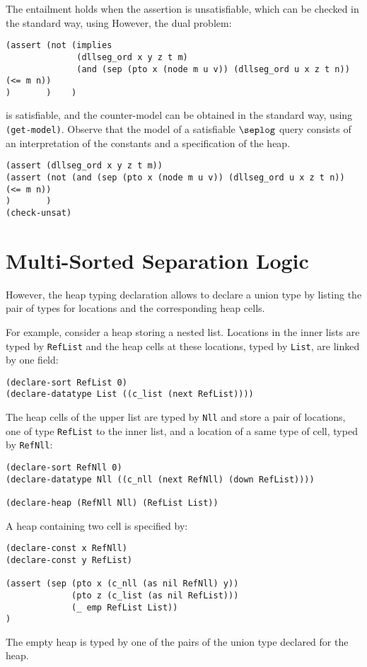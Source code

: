 \documentclass[10pt]{llncs}
\begin{document}
The entailment holds when the assertion is unsatisfiable, which can be
checked in the standard way, using 
However, the dual problem:
\begin{Verbatim}
(assert (not (implies 
              (dllseg_ord x y z t m)
              (and (sep (pto x (node m u v)) (dllseg_ord u x z t n)) (<= m n)) 
)       )    )
\end{Verbatim}
is satisfiable, and the counter-model can be obtained in the standard
way, using {\tt (get-model)}. Observe that the model of a satisfiable
$\seplog$ query consists of an interpretation of the constants and a
specification of the heap. 

\begin{Verbatim}
(assert (dllseg_ord x y z t m))
(assert (not (and (sep (pto x (node m u v)) (dllseg_ord u x z t n)) (<= m n))
)       )
(check-unsat)
\end{Verbatim}



\section{Multi-Sorted Separation Logic}
\label{sec:tsl}

However, the heap typing declaration allows to declare a union type
by listing the pair of types for locations and the corresponding 
heap cells.

For example, consider a heap storing a nested list.
Locations in the inner lists are typed by {\tt RefList} and 
the heap cells at these locations, typed by {\tt List}, 
are linked by one field:
\begin{Verbatim}
(declare-sort RefList 0)
(declare-datatype List ((c_list (next RefList))))
\end{Verbatim}
The heap cells of the upper list are typed by {\tt Nll} and 
store a pair of locations, one of type {\tt RefList} to the inner list,
and a location of a same type of cell, typed by {\tt RefNll}:
\begin{Verbatim}
(declare-sort RefNll 0)
(declare-datatype Nll ((c_nll (next RefNll) (down RefList))))

(declare-heap (RefNll Nll) (RefList List))
\end{Verbatim}
A heap containing two cell is specified by:
\begin{Verbatim}
(declare-const x RefNll)
(declare-const y RefList)

(assert (sep (pto x (c_nll (as nil RefNll) y))
             (pto z (c_list (as nil RefList)))
             (_ emp RefList List))
)
\end{Verbatim}
The empty heap is typed by one of the pairs of the union type declared
for the heap.
\end{document}
